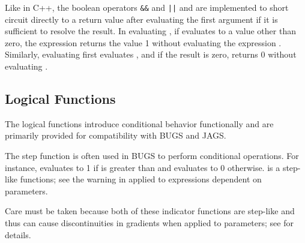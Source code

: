 \begin{description}
\begin{description}
\begin{description}
\begin{description}
\begin{description}
\begin{description}
\begin{description}
\begin{description}
Like in C++, the boolean operators \Verb/&&/ and \Verb/||/ and are implemented to short circuit directly to a return value after evaluating the first argument if it is sufficient to resolve the result.  In evaluating , if  evaluates to a value other than zero, the expression returns the value 1 without evaluating the expression .  Similarly, evaluating  first evaluates , and if the result is zero, returns 0 without evaluating .

\subsection{Logical Functions}

The logical functions introduce conditional behavior functionally and are primarily provided for compatibility with BUGS and JAGS.

\begin{description}   %

 The step function is often used in BUGS to perform conditional operations.  For instance,  evaluates to 1 if  is greater than  and evaluates to 0 otherwise.  is a step-like functions; see the warning in  applied to expressions dependent on parameters.

\begin{description}   %



\begin{description}   %

 Care must be taken because both of these indicator functions are step-like and thus can cause discontinuities in gradients when applied to parameters; see  for details.


\end{description}
\end{description}
\end{description}
\end{description}
\end{description}
\end{description}
\end{description}
\end{description}
\end{description}
\end{description}
\end{description}

